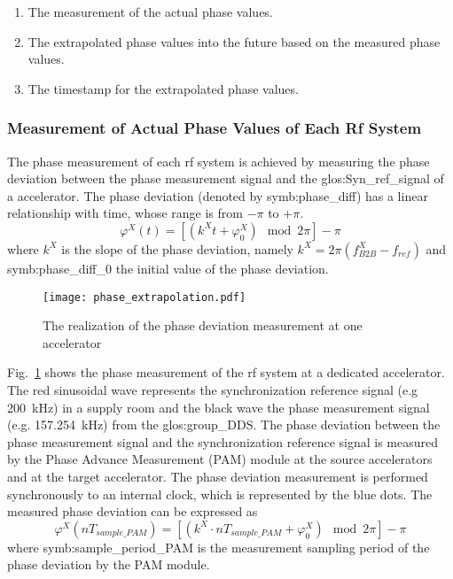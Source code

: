 \begin{enumerate}
\item The measurement of the actual phase values.
\item The extrapolated phase values into the future based on the measured phase values.
\item The timestamp for the extrapolated phase values.
\end{enumerate}


 \subsubsection{Measurement of Actual Phase Values of Each Rf System}
The phase measurement of each rf system is achieved by measuring the phase deviation between the phase measurement signal and the \gls{glos:Syn_ref_signal} of a accelerator. The phase deviation (denoted by \gls{symb:phase_diff}) has a linear relationship with time, whose range is from $-\pi$ to $+\pi$. 
\begin{equation}
\varphi^X(t)= [(k^\mathit{X}t+\varphi^X_0) \mod 2\pi] - \pi
\end{equation}
where $k^\mathit{X}$ is the slope of the phase deviation, namely $k^\mathit{X}=2\pi(f_\mathit{B2B}^{X}-f_\mathit{ref})$ and \gls{symb:phase_diff_0} the initial value of the phase deviation.



\begin{figure}[!htb]
   \centering   
   \texttt{[image: phase\_extrapolation.pdf]}
   \caption{The realization of the phase deviation measurement at one accelerator}
   \label{phase_prediction}
\end{figure}

Fig.~\ref{phase_prediction} shows the phase measurement of the rf system at a dedicated accelerator. The red sinusoidal wave represents the synchronization reference signal (e.g \SI{200}{kHz}) in a supply room and the black wave the phase measurement signal (e.g. \SI{157.254}{kHz}) from the \gls{glos:group_DDS}. The phase deviation between the phase measurement signal and the synchronization reference signal is measured by the Phase Advance Measurement (\gls{PAM}) module at the source accelerators and at the target accelerator. The phase deviation measurement is performed synchronously to an internal clock, which is represented by the blue dots. The measured phase deviation can be expressed as
\begin{equation}
\varphi^X(nT_\mathit{sample\_PAM})=[( k^\mathit{X}\cdot nT_\mathit{sample\_PAM}+\varphi^X_0) \mod 2\pi ]-\pi
\end{equation}
where \gls{symb:sample_period_PAM} is the measurement sampling period of the phase deviation by the PAM module.


